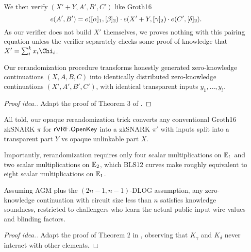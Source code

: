 We then verify $(X' + Y,A',B',C')$ like Groth16 
$$ e(A',B') = e([\alpha]_1, [\beta]_2) \cdot
 e(X' + Y, [\gamma]_2) \cdot e(C', [\delta]_2) . $$
As our verifier does not build $X'$ themselves, we proves nothing
with this pairing equation unless the verifier separately checks
 some proof-of-knowledge that $X' = \sum_i^k x_i \Chi_i$.

\begin{lemma}\label{lem:unlinkable}
Our rerandomization procedure %
transforms honestly generated zero-knowledge continuations $(X,A,B,C)$
into identically distributed zero-knowledge continuations $(X',A',B',C')$,
with identical transparent inputs $y_1,\ldots,y_l$.
\end{lemma}

\begin{proof}[Proof idea.]
Adapt the proof of Theorem 3 of \cite[Appendix C, pp. 31]{RandomizationGroth16}.
\end{proof}


All told, our opaque rerandomization trick converts any conventional
Groth16 zkSNARK $\pi$ for ${\mathsf{rVRF}}.{\mathsf{OpenKey}}$ into a zkSNARK $\pi'$
with inputs split into a transparent part $Y$ vs opaque unlinkable part $X$.

Importantly, rerandomization requires only
 four scalar multiplications on ${\mathbb{E}}_1$ and
 two scalar multiplications on ${\mathbb{E}}_2$,
which  BLS12 curves make roughly equivalent to
 eight scalar multiplications on ${\mathbb{E}}_1$.


\begin{lemma}\label{lem:knowledge_soundness}
Assuming AGM plus the $(2n-1,n-1)$-DLOG assumption,
any zero-knowledge continuation with circuit size less than $n$
satisfies knowledge soundness, restricted to challengers
 who learn the actual public input wire values and blinding factors.
\end{lemma}

\begin{proof}[Proof idea.]
Adapt the proof of Theorem 2 in \cite[\S3, pp. 9]{RandomizationGroth16},
observing that $K_\gamma$ and $K_\delta$ never interact with other elements. 
\end{proof}

